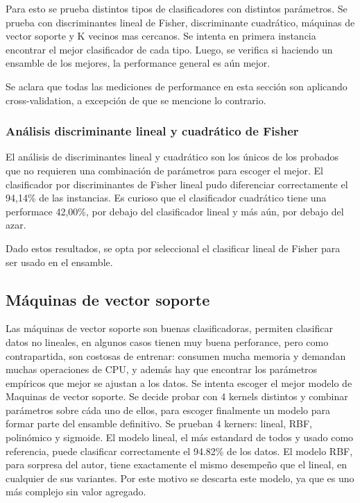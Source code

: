 \documentclass[journal]{IEEEtran}
\begin{document}
Para esto se prueba distintos tipos de clasificadores con distintos parámetros.
Se prueba con discriminantes lineal de Fisher, discriminante cuadrático,
máquinas de vector soporte y K vecinos mas cercanos. Se intenta en primera 
instancia encontrar el mejor clasificador de cada tipo. Luego, se verifica si
haciendo un ensamble de los mejores, la performance general es aún mejor.

Se aclara que todas las mediciones de performance en esta
sección son aplicando cross-validation, a excepción de que se mencione lo
contrario.

\subsubsection{Análisis discriminante lineal y cuadrático de Fisher}
El análisis de discriminantes lineal y cuadrático son los únicos de los probados
que no requieren una combinación de parámetros para escoger el mejor. El
clasificador por discriminantes de Fisher lineal pudo diferenciar correctamente
el 94,14\% de las instancias. Es curioso que el clasificador cuadrático tiene
una performace 42,00\%, por debajo del clasificador lineal y más aún, por debajo
del azar. 

Dado estos resultados, se opta por seleccional el clasificar lineal de Fisher
para ser usado en el ensamble.

\subsection{Máquinas de vector soporte}
Las máquinas de vector soporte son buenas clasificadoras, permiten
clasificar datos no lineales, en algunos casos tienen muy buena perforance,
pero como contrapartida, son costosas de entrenar: consumen mucha  memoria y
demandan muchas operaciones de CPU, y además hay que encontrar
los parámetros empíricos que mejor se ajustan a los datos.  
Se intenta escoger el mejor modelo de Maquinas de vector soporte. Se
decide probar con 4 kernels distintos y combinar parámetros sobre
cáda uno de ellos, para escoger finalmente un modelo para formar parte
del ensamble definitivo. Se prueban 4 kerners: lineal, RBF, polinómico y
sigmoide. El modelo lineal, el más estandard de todos y usado como referencia,
puede clasificar correctamente el 94.82\% de los datos. El modelo RBF, para
sorpresa del autor, tiene exactamente el mismo desempeño que el lineal, 
en cualquier de sus variantes. Por este motivo se descarta este modelo,
ya que es uno más complejo sin valor agregado. 
\end{document}
